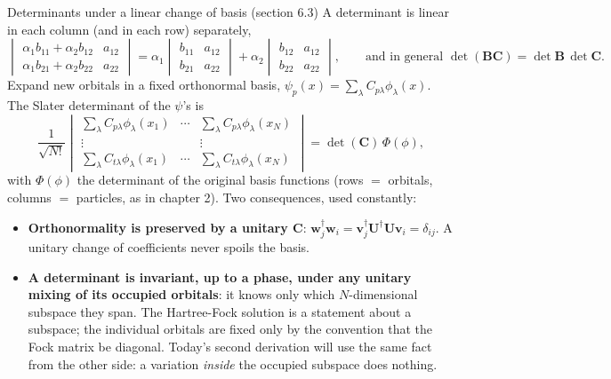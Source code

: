 \documentclass[aspectratio=169,10pt]{beamer}
\begin{document}
\begin{frame}{Determinants under a linear change of basis (section 6.3)}
  \footnotesize
  A determinant is linear in each column (and in each row) separately,
  \[
    \begin{vmatrix}\alpha_1b_{11}+\alpha_2b_{12} & a_{12}\\ \alpha_1b_{21}+\alpha_2b_{22} & a_{22}\end{vmatrix}
    =\alpha_1\begin{vmatrix}b_{11} & a_{12}\\ b_{21} & a_{22}\end{vmatrix}+\alpha_2\begin{vmatrix}b_{12} & a_{12}\\ b_{22} & a_{22}\end{vmatrix},
    \qquad\text{and in general }\det(\bm{B}\bm{C})=\det\bm{B}\,\det\bm{C}.
  \]
  Expand new orbitals in a fixed orthonormal basis, $\psi_p(x)=\sum_\lambda C_{p\lambda}\phi_\lambda(x)$. The Slater determinant of the $\psi$'s is
  \[
    \frac{1}{\sqrt{N!}}
    \begin{vmatrix}
      \sum_\lambda C_{p\lambda}\phi_\lambda(x_1) & \cdots & \sum_\lambda C_{p\lambda}\phi_\lambda(x_N)\\
      \vdots & & \vdots\\
      \sum_\lambda C_{t\lambda}\phi_\lambda(x_1) & \cdots & \sum_\lambda C_{t\lambda}\phi_\lambda(x_N)
    \end{vmatrix}
    =\det(\bm{C})\,\Phi(\phi),
  \]
  with $\Phi(\phi)$ the determinant of the original basis functions (rows $=$ orbitals, columns $=$ particles, as in chapter 2). Two consequences, used constantly:
  \begin{itemize}
    \item \textbf{Orthonormality is preserved by a unitary $\bm{C}$}: $\bm{w}_j^{\dagger}\bm{w}_i=\bm{v}_j^{\dagger}\bm{U}^{\dagger}\bm{U}\bm{v}_i=\delta_{ij}$. A unitary change of coefficients never spoils the basis.
    \item \textbf{A determinant is invariant, up to a phase, under any unitary mixing of its occupied orbitals}: it knows only which $N$-dimensional subspace they span. The Hartree-Fock solution is a statement about a \alert{subspace}; the individual orbitals are fixed only by the convention that the Fock matrix be diagonal. Today's second derivation will use the same fact from the other side: a variation \emph{inside} the occupied subspace does nothing.
  \end{itemize}
\end{frame}
\end{document}
